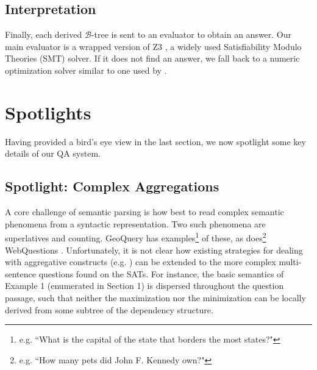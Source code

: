 \documentclass[11pt,letterpaper]{article}
\begin{document}


\subsection{Interpretation}

Finally, each derived $\mathcal{B}$-tree is sent to an evaluator to obtain an answer. Our main evaluator is a wrapped version of Z3 \cite{Moura2008Z3AE}, a widely used Satisfiability Modulo Theories (SMT) solver. If it does not find an answer, we fall back to a numeric optimization solver similar to one used by \cite{Seo2015SolvingGP}.

\section{Spotlights}

Having provided a bird's eye view in the last section, we now spotlight some key  details of our QA system.

\subsection{Spotlight: Complex Aggregations\label{sec:aggregrations}}

A core challenge of semantic parsing is how best to read complex semantic phenomena from a syntactic representation. Two such phenomena are superlatives and counting. GeoQuery \cite{Zelle1996LearningTP} has examples\footnote{e.g. ``What is the capital of the state that borders the most states?"} of these, as does\footnote{e.g. ``How many pets did John F. Kennedy own?"} WebQuestions \cite{Berant2013SemanticPO}. Unfortunately, it is not clear how existing strategies for dealing with aggregative constructs (e.g. \cite{Liang2011LearningDC}) can be extended to the more complex multi-sentence questions found on the SATs. For instance, the basic semantics of Example 1 (enumerated in Section 1) is dispersed throughout the question passage, such that neither the maximization nor the minimization can be locally derived from some subtree of the dependency structure. 
\end{document}
